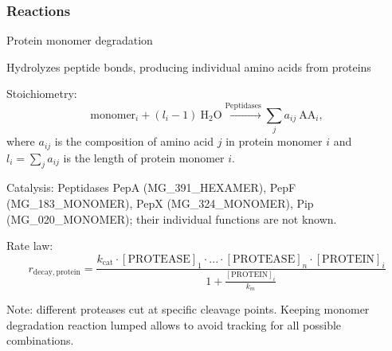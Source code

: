 \documentclass[10pt]{article}
\begin{document}
\subsubsection{Reactions}
\begin{compactitem}
\item Protein monomer degradation
    \begin{compactitem}
    \item Hydrolyzes peptide bonds, producing individual amino acids from proteins
    \item Stoichiometry:
        \begin{equation*}
        \text{monomer}_i + (l_i - 1)~\text{H$_\text{2}$O} \xrightarrow{\text{Peptidases}} \sum_j a_{ij}~\text{AA}_i,
        \end{equation*}    
        where $a_{ij}$ is the composition of amino acid $j$ in protein monomer $i$ and $l_i = \sum_j a_{ij}$ is the length of protein monomer $i$.
    \item Catalysis: Peptidases PepA (MG\_391\_HEXAMER), PepF (MG\_183\_MONOMER), PepX (MG\_324\_MONOMER), Pip (MG\_020\_MONOMER); their individual functions are not known.
     \item Rate law:
\[
r_{\mathrm{decay,protein}} = \frac{k_{\mathrm{cat}} \cdot [\mathrm{PROTEASE}]_1 \cdot ... \cdot \mathrm{[PROTEASE]}_n \cdot \mathrm{[PROTEIN]}_i}{1 + \frac{[\mathrm{PROTEIN}]_i}{k_{m}}}
\]
 
\item Note: different proteases cut at specific cleavage points. %
 Keeping monomer degradation reaction lumped allows to avoid tracking for all possible combinations.  


\end{compactitem}
\end{compactitem}
\end{document}
